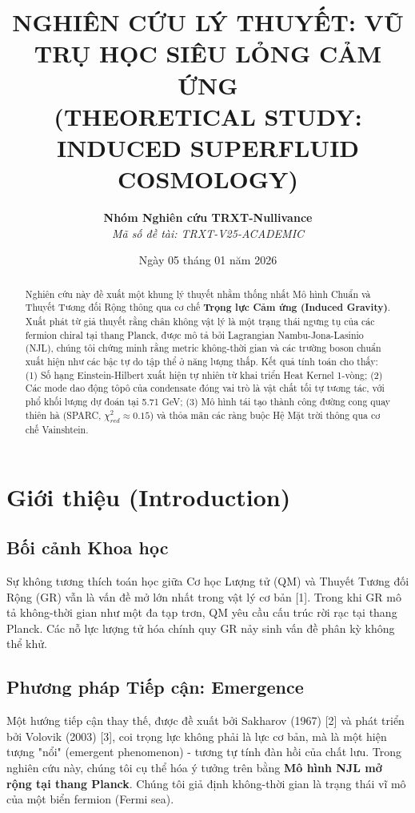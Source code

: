 \documentclass[a4paper,12pt]{article}
\title{\textbf{NGHIÊN CỨU LÝ THUYẾT: VŨ TRỤ HỌC SIÊU LỎNG CẢM ỨNG}\\
\large (THEORETICAL STUDY: INDUCED SUPERFLUID COSMOLOGY)}
\author{\textbf{Nhóm Nghiên cứu TRXT-Nullivance}\\
\textit{Mã số đề tài: TRXT-V25-ACADEMIC}}
\date{Ngày 05 tháng 01 năm 2026}
\begin{document}
\maketitle

\begin{abstract}
Nghiên cứu này đề xuất một khung lý thuyết nhằm thống nhất Mô hình Chuẩn và Thuyết Tương đối Rộng thông qua cơ chế \textbf{Trọng lực Cảm ứng (Induced Gravity)}. Xuất phát từ giả thuyết rằng chân không vật lý là một trạng thái ngưng tụ của các fermion chiral tại thang Planck, được mô tả bởi Lagrangian Nambu-Jona-Lasinio (NJL), chúng tôi chứng minh rằng metric không-thời gian và các trường boson chuẩn xuất hiện như các bậc tự do tập thể ở năng lượng thấp.
Kết quả tính toán cho thấy:
(1) Số hạng Einstein-Hilbert xuất hiện tự nhiên từ khai triển Heat Kernel 1-vòng;
(2) Các mode dao động tôpô của condensate đóng vai trò là vật chất tối tự tương tác, với phổ khối lượng dự đoán tại 5.71 GeV;
(3) Mô hình tái tạo thành công đường cong quay thiên hà (SPARC, $\chi^2_{red} \approx 0.15$) và thỏa mãn các ràng buộc Hệ Mặt trời thông qua cơ chế Vainshtein.
\end{abstract}

\tableofcontents
\newpage

\section{Giới thiệu (Introduction)}

\subsection{Bối cảnh Khoa học}
Sự không tương thích toán học giữa Cơ học Lượng tử (QM) và Thuyết Tương đối Rộng (GR) vẫn là vấn đề mở lớn nhất trong vật lý cơ bản [1]. Trong khi GR mô tả không-thời gian như một đa tạp trơn, QM yêu cầu cấu trúc rời rạc tại thang Planck. Các nỗ lực lượng tử hóa chính quy GR nảy sinh vấn đề phân kỳ không thể khử.

\subsection{Phương pháp Tiếp cận: Emergence}
Một hướng tiếp cận thay thế, được đề xuất bởi Sakharov (1967) [2] và phát triển bởi Volovik (2003) [3], coi trọng lực không phải là lực cơ bản, mà là một hiện tượng "nổi" (emergent phenomenon) - tương tự tính đàn hồi của chất lưu.
Trong nghiên cứu này, chúng tôi cụ thể hóa ý tưởng trên bằng \textbf{Mô hình NJL mở rộng tại thang Planck}. Chúng tôi giả định không-thời gian là trạng thái vĩ mô của một biển fermion (Fermi sea).
\end{document}
